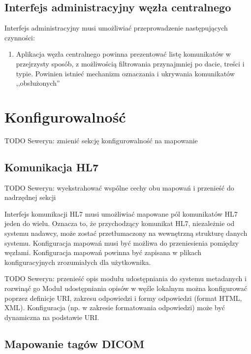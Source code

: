 \documentclass[a4paper]{report}
\begin{document}
\begin{enumerate}
\begin{enumerate}
\end{enumerate}

\subsection{Interfejs administracyjny węzła centralnego}

Interfejs administracyjny musi umożliwiać przeprowadzenie następujących czynności:
\begin{enumerate}
  \item Aplikacja węzła centralnego powinna prezentować listę komunikatów w przejrzysty sposób, z możliwością filtrowania przynajmniej po dacie, treści i typie. Powinien istnieć mechanizm oznaczania i ukrywania komunikatów ,,obsłużonych''
\end{enumerate}

\end{enumerate}

\section{Konfigurowalność}

TODO Seweryn: zmienić sekcję konfigurowalność na mapowanie

\subsection{Komunikacja HL7}

TODO Seweryn: wyekstrahować wspólne cechy obu mapowań i przenieść do nadrzędnej sekcji

Interfejs komunikacji HL7 musi umożliwiać mapowane pól komunikatów HL7 jeden do wielu. Oznacza to, że przychodzący komunikat HL7, niezależnie od systemu nadawcy, może zostać przetłumaczony na wewnętrzną strukturę danych systemu. Konfiguracja mapowań musi być możliwa do przeniesienia pomiędzy węzłami. Konfiguracja mapowań powinna być zapisana w plikach konfiguracyjnych zrozumiałych dla użytkownika.

TODO Seweryn: przenieść opis modułu udostępniania do systemu metadanych i rozwinąć go
Moduł udostępniania opisów w węźle lokalnym można konfigurować poprzez definicje URI, zakresu odpowiedzi i formy odpowiedzi (format HTML, XML). Konfiguracja (np. w zakresie formatowania odpowiedzi) może być dynamiczna na podstawie URI. 

\subsection{Mapowanie tagów DICOM}
\end{document}
